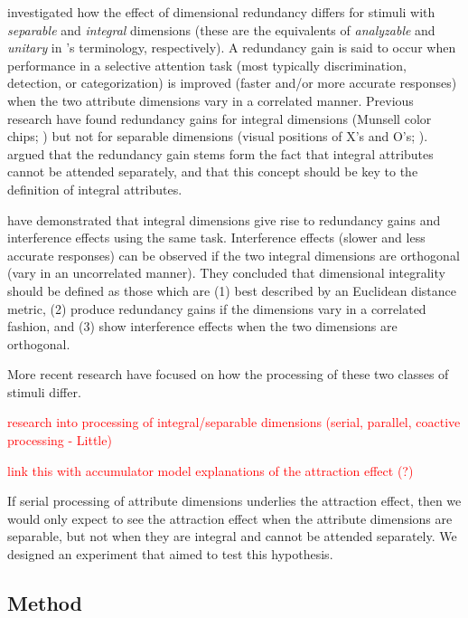 \documentclass[11pt,a4paper]{article}
\begin{document}
 investigated how the effect of dimensional redundancy differs for stimuli with \textit{separable} and \textit{integral} dimensions (these are the equivalents of \textit{analyzable} and \textit{unitary} in \citeauthor{Shepard1964}'s terminology, respectively). A redundancy gain is said to occur when performance in a selective attention task (most typically discrimination, detection, or categorization) is improved (faster and/or more accurate responses) when the two attribute dimensions vary in a correlated manner. Previous research have found redundancy gains for integral dimensions (Munsell color chips; ) but not for separable dimensions (visual positions of X's and O's; ). \citeauthor{Lockhead1966} argued that the redundancy gain stems form the fact that integral attributes cannot be attended separately, and that this concept should be key to the definition of integral attributes. 

 have demonstrated that integral dimensions give rise to redundancy gains and interference effects using the same task. Interference effects  (slower and less accurate responses) can be observed if the two integral dimensions are orthogonal (vary in an uncorrelated manner). They concluded that dimensional integrality should be defined as those which are (1) best described by an Euclidean distance metric, (2) produce redundancy gains if the dimensions vary in a correlated fashion, and (3) show interference effects when the two dimensions are orthogonal.

More recent research have focused on how the processing of these two classes of stimuli differ. 



\textcolor{red}{research into processing of integral/separable dimensions (serial, parallel, coactive processing - Little) }

\textcolor{red}{link this with accumulator model explanations of the attraction effect (?)}

If serial processing of attribute dimensions underlies the attraction effect, then we  would only expect to see the attraction effect when the attribute dimensions are separable, but not when they are integral and cannot be attended separately. We designed an experiment that aimed to test this hypothesis.


\subsection{Method}
\end{document}
